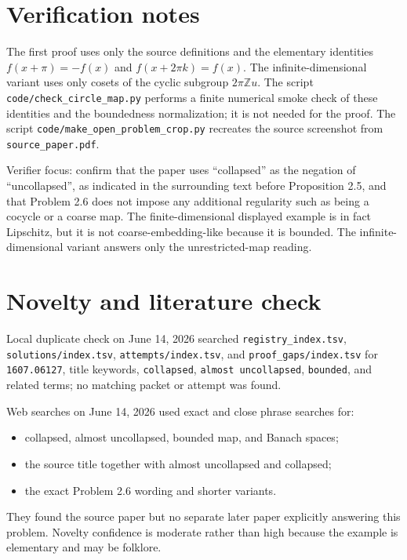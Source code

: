 \documentclass[11pt]{article}
\begin{document}
\section*{Verification notes}

The first proof uses only the source definitions and the elementary identities
\(f(x+\pi)=-f(x)\) and \(f(x+2\pi k)=f(x)\). The infinite-dimensional variant
uses only cosets of the cyclic subgroup \(2\pi\mathbb{Z}u\). The script
\texttt{code/check\_circle\_map.py} performs a finite numerical smoke check
of these identities and the boundedness normalization; it is not needed for
the proof. The script \texttt{code/make\_open\_problem\_crop.py} recreates
the source screenshot from \texttt{source\_paper.pdf}.

Verifier focus: confirm that the paper uses ``collapsed'' as the negation of
``uncollapsed'', as indicated in the surrounding text before Proposition 2.5,
and that Problem 2.6 does not impose any additional regularity such as being a
cocycle or a coarse map. The finite-dimensional displayed example is in fact
Lipschitz, but it is not coarse-embedding-like because it is bounded. The
infinite-dimensional variant answers only the unrestricted-map reading.

\section*{Novelty and literature check}

Local duplicate check on June 14, 2026 searched
\texttt{registry\_index.tsv}, \texttt{solutions/index.tsv},
\texttt{attempts/index.tsv}, and \texttt{proof\_gaps/index.tsv} for
\texttt{1607.06127}, title keywords, \texttt{collapsed},
\texttt{almost uncollapsed}, \texttt{bounded}, and related terms; no matching
packet or attempt was found.

Web searches on June 14, 2026 used exact and close phrase searches for:
\begin{itemize}
\item collapsed, almost uncollapsed, bounded map, and Banach spaces;
\item the source title together with almost uncollapsed and collapsed;
\item the exact Problem 2.6 wording and shorter variants.
\end{itemize}
They found the source paper but no separate later paper explicitly answering
this problem. Novelty confidence is moderate rather than high because the
example is elementary and may be folklore.
\end{document}
